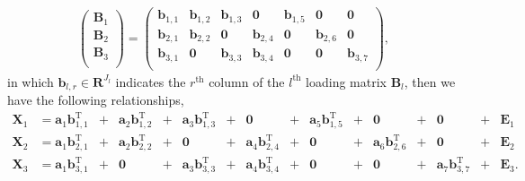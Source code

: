 \begin{equation*}
\begin{aligned}
   \left(
                 \begin{array}{c}
                   \mathbf{B}_1 \\
                   \mathbf{B}_2 \\
                   \mathbf{B}_3 \\
                 \end{array}
               \right)
               = \left(
                   \begin{array}{cccccccc}
                     \mathbf{b}_{1,1} & \mathbf{b}_{1,2} & \mathbf{b}_{1,3} & \mathbf{0}       & \mathbf{b}_{1,5} & \mathbf{0}       & \mathbf{0}      \\
                     \mathbf{b}_{2,1} & \mathbf{b}_{2,2} & \mathbf{0}       & \mathbf{b}_{2,4} & \mathbf{0}       & \mathbf{b}_{2,6} & \mathbf{0}       \\
                     \mathbf{b}_{3,1} & \mathbf{0}       & \mathbf{b}_{3,3} & \mathbf{b}_{3,4} & \mathbf{0}       & \mathbf{0}       & \mathbf{b}_{3,7} \\
                   \end{array}
                 \right),
\end{aligned}
\end{equation*}
in which $\mathbf{b}_{l,r} \in \mathbf{R}^{J_l}$ indicates the $r^{\text{th}}$ column of the $l^{\text{th}}$ loading matrix $\mathbf{B}_l$, then we have the following relationships,
\begin{equation*}
\begin{aligned}
   \mathbf{X}_1 & = \mathbf{a}_1\mathbf{b}_{1,1}^{\text{T}} &+& \mathbf{a}_2\mathbf{b}_{1,2}^{\text{T}} &+& \mathbf{a}_3\mathbf{b}_{1,3}^{\text{T}} &+& \mathbf{0}                     &+& \mathbf{a}_5\mathbf{b}_{1,5}^{\text{T}} &+& \mathbf{0}                     &+& \mathbf{0}  &+& \mathbf{E}_1                   \\
   \mathbf{X}_2 & = \mathbf{a}_1\mathbf{b}_{2,1}^{\text{T}} &+& \mathbf{a}_2\mathbf{b}_{2,2}^{\text{T}} &+& \mathbf{0}                     &+& \mathbf{a}_4\mathbf{b}_{2,4}^{\text{T}} &+& \mathbf{0}                     &+& \mathbf{a}_6\mathbf{b}_{2,6}^{\text{T}} &+& \mathbf{0}  &+& \mathbf{E}_2                   \\
   \mathbf{X}_3 & = \mathbf{a}_1\mathbf{b}_{3,1}^{\text{T}} &+& \mathbf{0}                     &+& \mathbf{a}_3\mathbf{b}_{3,3}^{\text{T}} &+& \mathbf{a}_4\mathbf{b}_{3,4}^{\text{T}} &+& \mathbf{0}                     &+& \mathbf{0}                     &+& \mathbf{a}_7\mathbf{b}_{3,7}^{\text{T}} &+& \mathbf{E}_3 .
\end{aligned}
\end{equation*}
